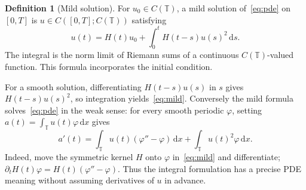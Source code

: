 \documentclass[a4paper,10pt]{article}
\numberwithin{equation}{section}
\theoremstyle{definition}
\newtheorem{definition}[theorem]{Definition}
\theoremstyle{remark}
\newcommand{\T}{\mathbb T}
\newcommand{\dd}{\,\mathrm d}
\begin{document}
\begin{definition}[Mild solution]\label{def:mild}
For $u_0\in C(\T)$, a mild solution of~\eqref{eq:pde} on $[0,T]$ is
$u\in C([0,T];C(\T))$ satisfying
\begin{equation}\label{eq:mild}
u(t)=H(t)u_0+\int_0^t H(t-s)u(s)^2\dd s.
\end{equation}
The integral is the norm limit of Riemann sums of a continuous
$C(\T)$-valued function. This formula incorporates the initial condition.
\end{definition}
For a smooth solution, differentiating $H(t-s)u(s)$ in $s$ gives
$H(t-s)u(s)^2$, so integration yields~\eqref{eq:mild}. Conversely the mild
formula solves~\eqref{eq:pde} in the weak sense: for every smooth periodic
$\varphi$, setting $a(t)=\int_\T u(t)\varphi\dd x$ gives
\[
a'(t)=\int_\T u(t)(\varphi''-\varphi)\dd x
       +\int_\T u(t)^2\varphi\dd x.
\]
Indeed, move the symmetric kernel $H$ onto $\varphi$ in~\eqref{eq:mild}
and differentiate; $\partial_tH(t)\varphi=H(t)(\varphi''-\varphi)$.
Thus the integral formulation has a precise PDE meaning without assuming
derivatives of $u$ in advance.
\end{document}
